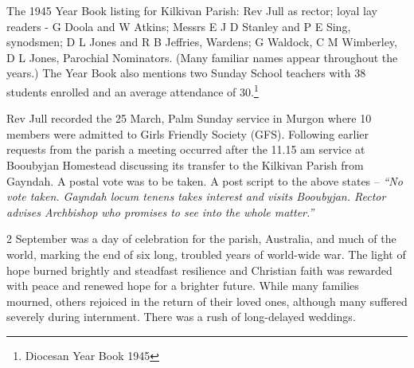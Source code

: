 The 1945 Year Book listing for Kilkivan Parish: Rev Jull as rector; loyal lay readers - G Doola and W Atkins; Messrs E J D Stanley and P E Sing, synodsmen; D L Jones and R B Jeffries, Wardens; G Waldock, C M Wimberley, D L Jones, Parochial Nominators. (Many familiar names appear throughout the years.) The Year Book also mentions two Sunday School teachers with 38 students enrolled and an average attendance of 30.\footnote{Diocesan Year Book 1945}


Rev Jull recorded the 25 March, Palm Sunday service in Murgon where 10 members were admitted to Girls Friendly Society (GFS). Following earlier requests from the parish a meeting occurred after the 11.15 am service at Booubyjan Homestead discussing its transfer to the Kilkivan Parish from Gayndah. A postal vote was to be taken. A post script to the above states -- \emph{``No vote taken. Gayndah locum tenens takes interest and visits Booubyjan. Rector advises Archbishop who promises to see into the whole matter.''}



2 September was a day of celebration for the parish, Australia, and much of the world, marking the end of six long, troubled years of world-wide war. The light of hope burned brightly and steadfast resilience and Christian faith was rewarded with peace and renewed hope for a brighter future. While many families mourned, others rejoiced in the return of their loved ones, although many suffered severely during internment. There was a rush of long-delayed weddings.









